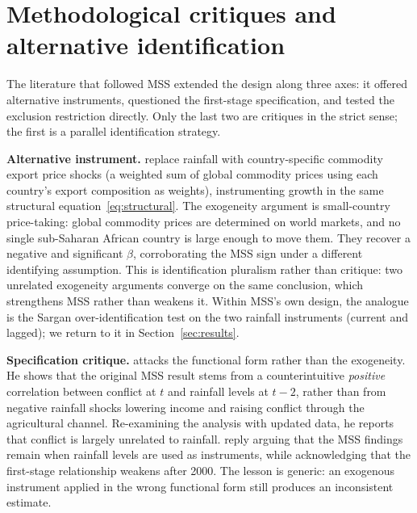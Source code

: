 \documentclass[11pt,a4paper]{article}
\begin{document}
\section{Methodological critiques and alternative identification}\label{sec:critiques}
The literature that followed MSS extended the design along three axes:
it offered alternative instruments, questioned the first-stage
specification, and tested the exclusion restriction directly. Only the
last two are critiques in the strict sense; the first is a parallel
identification strategy.

\textbf{Alternative instrument.} \citet{BrucknerCiccone2010} replace
rainfall with country-specific commodity export price shocks (a
weighted sum of global commodity prices using each country's export
composition as weights), instrumenting growth in the same structural
equation~\eqref{eq:structural}. The exogeneity argument is
small-country price-taking: global commodity prices are determined on
world markets, and no single sub-Saharan African country is large
enough to move them. They recover a negative and significant $\beta$,
corroborating the MSS sign under a different identifying assumption.
This is identification pluralism rather than critique: two unrelated
exogeneity arguments converge on the same conclusion, which strengthens
MSS rather than weakens it. Within MSS's own design, the analogue is
the Sargan over-identification test on the two rainfall instruments
(current and lagged); we return to it in Section~\ref{sec:results}.

\textbf{Specification critique.} \citet{Ciccone2011} attacks the
functional form rather than the exogeneity. He shows that the original
MSS result stems from a counterintuitive \emph{positive} correlation
between conflict at $t$ and rainfall levels at $t-2$, rather than from
negative rainfall shocks lowering income and raising conflict through
the agricultural channel. Re-examining the analysis with updated data,
he reports that conflict is largely unrelated to rainfall.
\citet{MiguelSatyanath2011} reply arguing that the MSS findings remain
when rainfall levels are used as instruments, while acknowledging that
the first-stage relationship weakens after 2000. The lesson is generic:
an exogenous instrument applied in the wrong functional form still
produces an inconsistent estimate.
\end{document}
